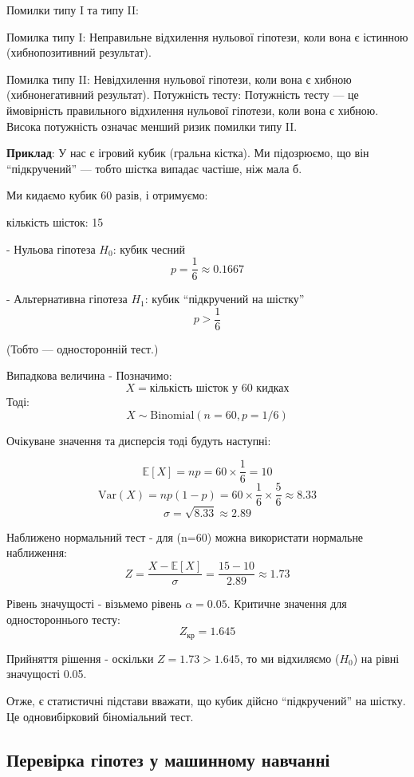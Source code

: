 Помилки типу I та типу II:

Помилка типу I: Неправильне відхилення нульової гіпотези, коли вона є істинною (хибнопозитивний результат).

Помилка типу II: Невідхилення нульової гіпотези, коли вона є хибною (хибнонегативний результат).
Потужність тесту: Потужність тесту — це ймовірність правильного відхилення нульової гіпотези, коли вона є хибною. Висока потужність означає менший ризик помилки типу II.



\textbf{Приклад}: У нас є ігровий кубик (гральна кістка).
Ми підозрюємо, що він “підкручений” — тобто шістка випадає частіше, ніж мала б.

Ми кидаємо кубик 60 разів, і отримуємо:

кількість шісток: 15

- Нульова гіпотеза $H_0$: кубик чесний
  $$
  p = \frac{1}{6} \approx 0.1667
  $$

- Альтернативна гіпотеза $H_1$: кубик “підкручений на шістку”
  $$
  p > \frac{1}{6}
  $$

(Тобто — односторонній тест.)

Випадкова величина -  Позначимо:
$$
X = \text{кількість шісток у 60 кидках}
$$
Тоді:
$$
X \sim \text{Binomial}(n = 60, p = 1/6)
$$

Очікуване значення та дисперсія тоді будуть наступні:

$$
\mathbb{E}[X] = n p = 60 \times \frac{1}{6} = 10
$$
$$
\mathrm{Var}(X) = n p (1 - p) = 60 \times \frac{1}{6} \times \frac{5}{6} \approx 8.33
$$
$$
\sigma = \sqrt{8.33} \approx 2.89
$$

Наближено нормальний тест - для (n=60) можна використати нормальне наближення:
$$
Z = \frac{X - \mathbb{E}[X]}{\sigma} = \frac{15 - 10}{2.89} \approx 1.73
$$

Рівень значущості - візьмемо рівень $\alpha = 0.05$.
Критичне значення для одностороннього тесту:
$$
Z_{кр} = 1.645
$$

Прийняття рішення - оскільки $Z = 1.73 > 1.645$, то ми відхиляємо ($H_{0}$) на рівні значущості 0.05.

Отже, є статистичні підстави вважати, що кубик дійсно “підкручений” на шістку. Це одновибірковий біноміальний тест.



\subsection{Перевірка гіпотез у машинному навчанні}

